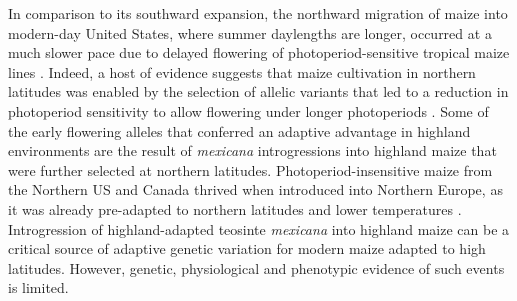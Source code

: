\documentclass[9pt,twocolumn,twoside,lineno]{biorxiv}
\begin{document}
In comparison to its southward expansion, the northward migration of maize into modern-day United States, where summer daylengths are longer, occurred at a much slower pace \cite{Da_Fonseca2015-zh, Swarts2017-ge} due to delayed flowering of photoperiod-sensitive tropical maize lines \cite{Hung2012-ms}.
Indeed, a host of evidence suggests that maize cultivation in northern latitudes was enabled by the selection of allelic variants that led to a reduction in photoperiod sensitivity to allow flowering under longer photoperiods \cite{Liang2018-af, Guo2018-on, Coles2010-db, Huang2018-ga, Yang2013-lg, Salvi2007-ku, Hung2012-ms}.
Some of the early flowering alleles that conferred an adaptive advantage in highland environments are the result of \textit{mexicana} introgressions into highland maize \cite{Guo2018-on} that were further selected at northern latitudes.
Photoperiod-insensitive maize from the Northern US and Canada thrived when introduced into Northern Europe, as it was already pre-adapted to northern latitudes and lower temperatures \cite{Brandenburg2017-ii}.
Introgression of highland-adapted teosinte \textit{mexicana} into highland maize can be a critical source of adaptive genetic variation for modern maize adapted to high latitudes.
However, genetic, physiological and phenotypic evidence of such events is  limited.
\end{document}
